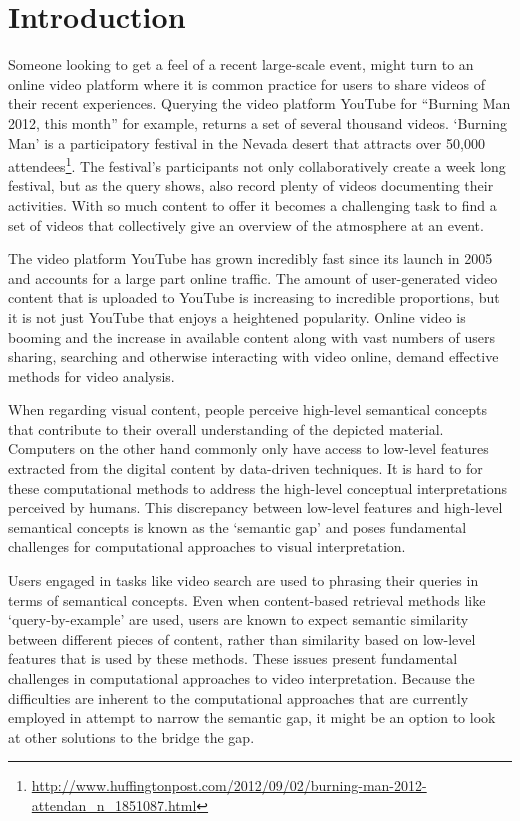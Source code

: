 \chapter{Introduction}
\label{ch:introduction}

Someone looking to get a feel of a recent large-scale event, might turn to an online video platform where it is common practice for users to share videos of their recent experiences\cite{Cha:2007ty,Cheng:2007tc}. Querying the video platform YouTube for ``Burning Man 2012, this month'' for example, returns a set of several thousand videos\cite{youtubeBM}. `Burning Man' is a participatory festival in the Nevada desert that attracts over 50,000 attendees\footnote{\url{http://www.huffingtonpost.com/2012/09/02/burning-man-2012-attendan_n_1851087.html}}. The festival's participants not only collaboratively create  a week long festival, but as the query shows, also record plenty of videos documenting their activities. With so much content to offer it becomes a challenging task to find a set of videos that collectively give an overview of the atmosphere at an event.

The video platform YouTube has grown incredibly fast since its launch in 2005 and accounts for a large part online traffic\cite{Cheng:2007tc}. The amount of user-generated video content that is uploaded to YouTube is increasing to incredible proportions, but it is not just YouTube that enjoys a heightened popularity. Online video is booming and the increase in available content along with vast numbers of users sharing, searching and otherwise interacting with video online, demand effective methods for video analysis.

When regarding visual content, people perceive high-level semantical concepts that contribute to their overall understanding of the depicted material. Computers on the other hand commonly only have access to low-level features extracted from the digital content by data-driven techniques. It is hard to for these computational methods to address the high-level conceptual interpretations perceived by humans. This discrepancy between low-level features and high-level semantical concepts is known as the `semantic gap'\cite{Smeulders:2000tx} and poses fundamental challenges for computational approaches to visual interpretation.

Users engaged in tasks like video search are used to phrasing their queries in terms of semantical concepts. Even when content-based retrieval methods like `query-by-example' are used, users are known to expect semantic similarity between different pieces of content, rather than similarity based on low-level features that is used by these methods\cite{Worring:2007vm, Snoek:jf, Hollink:2005ei}. These issues present fundamental challenges in computational approaches to video interpretation. Because the difficulties are inherent to the computational approaches that are currently employed in attempt to narrow the semantic gap, it might be an option to look at other solutions to the bridge the gap.

